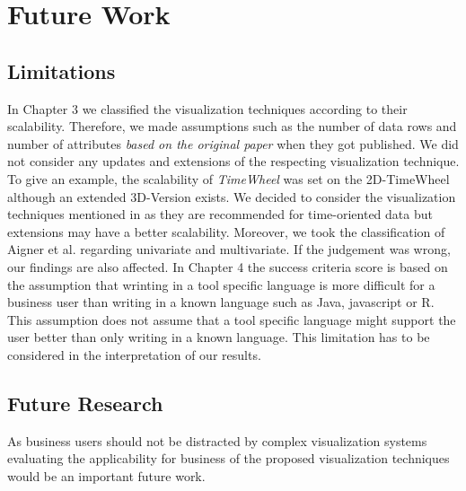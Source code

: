 \chapter{Future Work}
\label{Future Work}

\section{Limitations} \label{limitations}
In Chapter 3 we classified the visualization techniques according to their scalability. Therefore, we made assumptions such as the number of data rows and number of attributes \textit{based on the original paper} when they got published. We did not consider any updates and extensions of the respecting visualization technique. To give an example, the scalability of \textit{TimeWheel} was set on the 2D-TimeWheel although an extended 3D-Version exists. We decided to consider the visualization techniques mentioned in\cite{Aigner2011} as they are recommended for time-oriented data but extensions may have a better scalability.  
Moreover, we took the classification of Aigner et al.\cite{Aigner2011} regarding univariate and multivariate. If the judgement was wrong, our findings are also affected.
In Chapter 4 the success criteria score is based on the assumption that wrinting in a tool specific language is more difficult for a business user than writing in a known language such as Java, javascript or R. This assumption does not assume that a tool specific language might support the user better than only writing in a known language. This limitation has to be considered in the interpretation of our results.
\section{Future Research}


As business users should not be distracted by complex visualization systems \cite{Tegarden1999} evaluating the applicability for business of the proposed visualization techniques would be an important future work.
